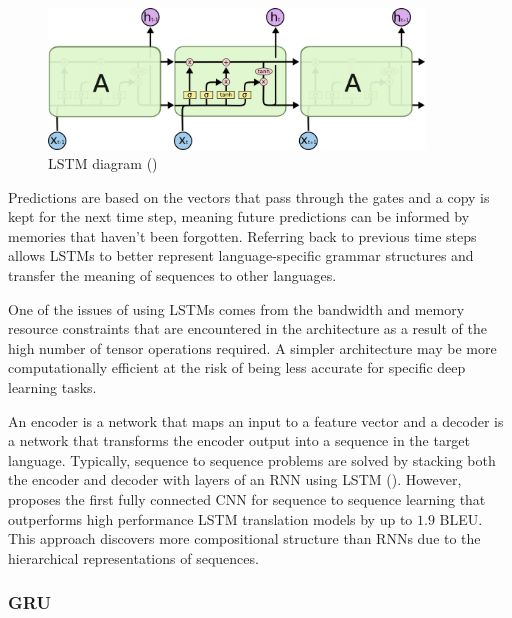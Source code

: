 \begin{figure}[ht!]
\centering
\includegraphics[width=0.89\textwidth]{media/literature/machine_learning/ml_rnn_lstm.png}
\caption[Long Short Term Memory]{\acrfull{LSTM} diagram (\cite{colah_lstm_2019})}
\label{fig:rnn_lstm}
\end{figure}

Predictions are based on the vectors that pass through the gates and a copy is kept for the next time step, meaning future predictions can be informed by memories that haven't been forgotten. Referring back to previous time steps allows \acrshort{LSTM}s to better represent language-specific grammar structures and transfer the meaning of sequences to other languages.


One of the issues of using \acrshort{LSTM}s comes from the bandwidth and memory resource constraints that are encountered in the architecture as a result of the high number of tensor operations required. A simpler architecture may be more computationally efficient at the risk of being less accurate for specific deep learning tasks.


An encoder is a network that maps an input to a feature vector and a decoder is a network that transforms the encoder output into a sequence in the target language. Typically, sequence to sequence problems are solved by stacking both the encoder and decoder with layers of an RNN using \acrshort{LSTM} (\cite{luong_effective_2015}). However, \cite{gehring_convolutional_2017} proposes the first fully connected \acrshort{CNN} for sequence to sequence learning that outperforms high performance \acrshort{LSTM} translation models by up to $1.9$ \acrshort{BLEU}. This approach discovers more compositional structure than \acrshort{RNN}s due to the hierarchical representations of sequences.

\subsubsection{\acrlong{GRU}}

